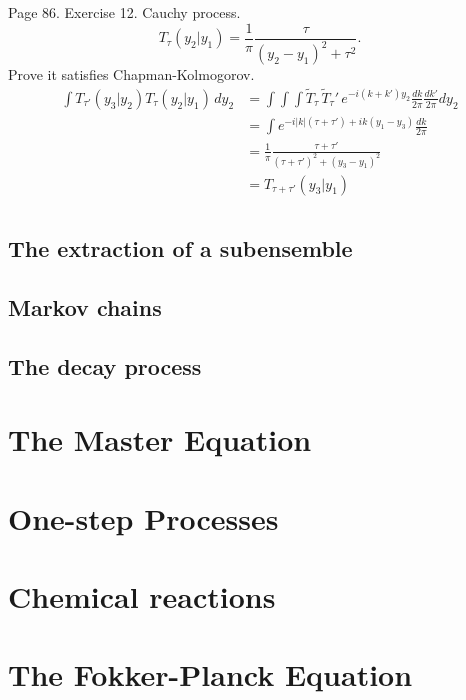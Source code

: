 \documentclass{book}
\numberwithin{equation}{section}
\theoremstyle{plain}
\theoremstyle{definition}
\theoremstyle{remark}
\begin{document}
Page 86.
Exercise 12.
Cauchy process.
\begin{equation}
  T_\tau(y_2|y_1)
  =
  \frac{1}{\pi}
  \frac{ \tau } { (y_2 - y_1)^2 + \tau^2 }.
\end{equation}
Prove it satisfies Chapman-Kolmogorov.
$$
\begin{aligned}
\int T_{\tau'}(y_3|y_2) T_\tau(y_2|y_1) \, dy_2
&=
\int \int \int \tilde T_\tau \, \tilde T_\tau' \,
e^{-i(k + k') y_2 } \frac{dk}{2\pi} \frac{dk'}{2\pi} dy_2
\\
&=
\int e^{ -i|k| (\tau +\tau') + ik (y_1 -y_3) } \frac{dk}{2\pi}
\\
&=
\frac{1}{\pi}
\frac{ \tau + \tau'}
{ (\tau + \tau')^2 + (y_3 - y_1)^2 } \\
&=
T_{\tau + \tau'}(y_3 | y_1) \\
\end{aligned}
$$



\section{The extraction of a subensemble}

\section{Markov chains}

\section{The decay process}


\chapter{The Master Equation}


\chapter{One-step Processes}


\chapter{Chemical reactions}


\chapter{The Fokker-Planck Equation}
\end{document}
